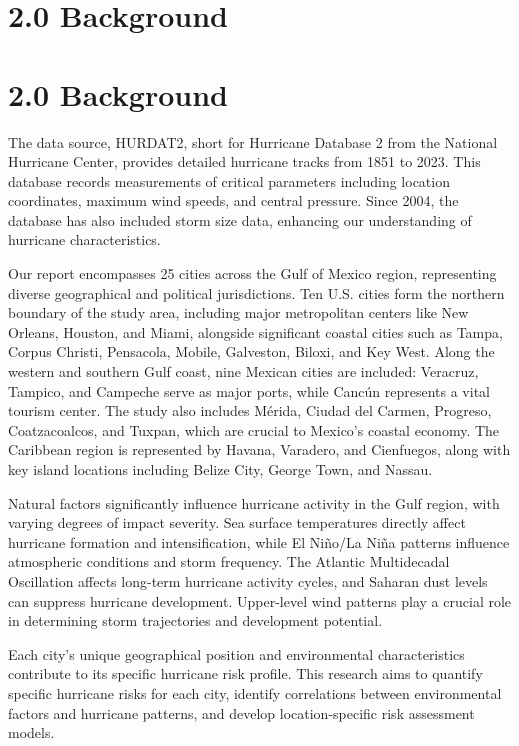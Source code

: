 \documentclass[12pt,letterpaper]{article}
\begin{document}
\section{2.0 Background}\label{background}

\section{2.0 Background}\label{background-1}

The data source, HURDAT2, short for Hurricane Database 2 from the
National Hurricane Center, provides detailed hurricane tracks from 1851
to 2023. This database records measurements of critical parameters
including location coordinates, maximum wind speeds, and central
pressure. Since 2004, the database has also included storm size data,
enhancing our understanding of hurricane characteristics.

Our report encompasses 25 cities across the Gulf of Mexico region,
representing diverse geographical and political jurisdictions. Ten U.S.
cities form the northern boundary of the study area, including major
metropolitan centers like New Orleans, Houston, and Miami, alongside
significant coastal cities such as Tampa, Corpus Christi, Pensacola,
Mobile, Galveston, Biloxi, and Key West. Along the western and southern
Gulf coast, nine Mexican cities are included: Veracruz, Tampico, and
Campeche serve as major ports, while Cancún represents a vital tourism
center. The study also includes Mérida, Ciudad del Carmen, Progreso,
Coatzacoalcos, and Tuxpan, which are crucial to Mexico's coastal
economy. The Caribbean region is represented by Havana, Varadero, and
Cienfuegos, along with key island locations including Belize City,
George Town, and Nassau.

Natural factors significantly influence hurricane activity in the Gulf
region, with varying degrees of impact severity. Sea surface
temperatures directly affect hurricane formation and intensification,
while El Niño/La Niña patterns influence atmospheric conditions and
storm frequency. The Atlantic Multidecadal Oscillation affects long-term
hurricane activity cycles, and Saharan dust levels can suppress
hurricane development. Upper-level wind patterns play a crucial role in
determining storm trajectories and development potential.

Each city's unique geographical position and environmental
characteristics contribute to its specific hurricane risk profile. This
research aims to quantify specific hurricane risks for each city,
identify correlations between environmental factors and hurricane
patterns, and develop location-specific risk assessment models.
\end{document}
